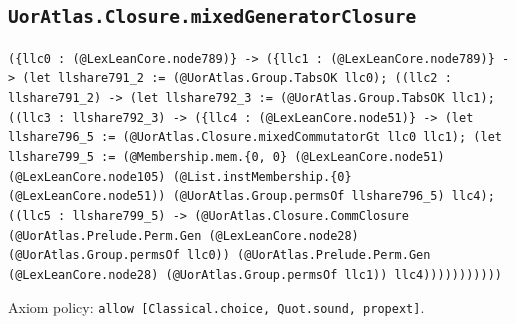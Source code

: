 \documentclass[11pt]{article}
\begin{document}
\subsection*{\texttt{UorAtlas.Closure.mixedGeneratorClosure}}
\noindent\texttt{(\{llc0 : (@LexLeanCore.node789)\} -> (\{llc1 : (@LexLeanCore.node789)\} -> (let llshare791\_2 := (@UorAtlas.Group.TabsOK llc0); ((llc2 : llshare791\_2) -> (let llshare792\_3 := (@UorAtlas.Group.TabsOK llc1); ((llc3 : llshare792\_3) -> (\{llc4 : (@LexLeanCore.node51)\} -> (let llshare796\_5 := (@UorAtlas.Closure.mixedCommutatorGt llc0 llc1); (let llshare799\_5 := (@Membership.mem.\{0, 0\} (@LexLeanCore.node51) (@LexLeanCore.node105) (@List.instMembership.\{0\} (@LexLeanCore.node51)) (@UorAtlas.Group.permsOf llshare796\_5) llc4); ((llc5 : llshare799\_5) -> (@UorAtlas.Closure.CommClosure (@UorAtlas.Prelude.Perm.Gen (@LexLeanCore.node28) (@UorAtlas.Group.permsOf llc0)) (@UorAtlas.Prelude.Perm.Gen (@LexLeanCore.node28) (@UorAtlas.Group.permsOf llc1)) llc4)))))))))))}\par
\noindent Axiom policy: \texttt{allow [Classical.choice, Quot.sound, propext]}.\par
\end{document}
